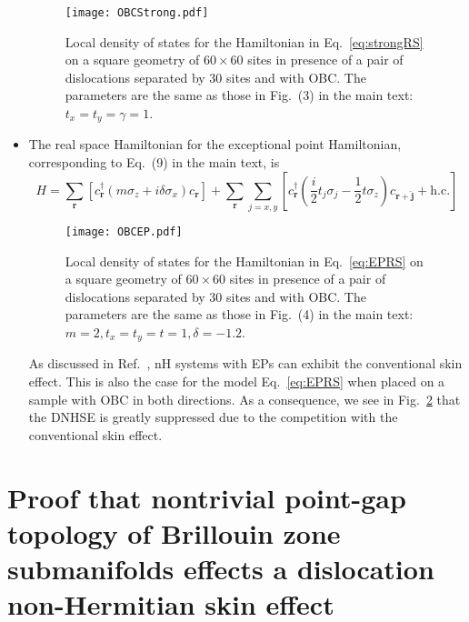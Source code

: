 \documentclass[prb,reprint,twocolumn,preprintnumbers,amsmath,amssymb,showpacs,nofootinbib,superscriptaddress]{revtex4-2}
\begin{document}
\begin{itemize}
\begin{figure}[t]
    \centering
    \texttt{[image: OBCStrong.pdf]}
    \caption{Local density of states for the Hamiltonian in Eq.~\eqref{eq:strongRS} on a square geometry of $60 \times 60$ sites in presence of a pair of dislocations separated by $30$ sites and with OBC. The parameters are the same as those in Fig.~(3) in the main text: $t_x = t_y = \gamma = 1$.}
    \label{fig:OBCStrong}
\end{figure}

\item The real space Hamiltonian for the exceptional point Hamiltonian, corresponding to Eq.~(9) in the main text, is
\begin{equation}
    \label{eq:EPRS}
    H = \sum_{\bm{r}} \left[ c_{\bm{r}}^\dagger \left(m \sigma_z + i \delta \sigma_x \right)c_{\bm{r}} \right] +  \sum_{\bm{r}} \sum_{j=x,y} \left[ c_{\bm{r}}^\dagger \left(\frac{i}{2}t_j \sigma_j -\frac{1}{2}t \sigma_z \right) c_{\bm{r}+ \bm{\hat{j}}}+ \text{h.c.} \right]
\end{equation}


\begin{figure}[t]
    \centering
    \texttt{[image: OBCEP.pdf]}
    \caption{Local density of states for the Hamiltonian in Eq.~\eqref{eq:EPRS} on a square geometry of $60 \times 60$ sites in presence of a pair of dislocations separated by $30$ sites and with OBC. The parameters are the same as those in Fig.~(4) in the main text: $m=2, t_x = t_y = t = 1, \delta=-1.2$.}
    \label{fig:OBCEP}
\end{figure}
As discussed in Ref.~\cite{zhang2021universal}, nH systems with EPs can exhibit the conventional skin effect. This is also the case for the model Eq.~\eqref{eq:EPRS} when placed on a sample with OBC in both directions. As a consequence, we see in Fig.~\ref{fig:OBCEP} that the DNHSE is greatly suppressed due to the competition with the conventional skin effect. 

\end{itemize}


\section{Proof that nontrivial point-gap topology of Brillouin zone submanifolds effects a dislocation non-Hermitian skin effect}
\label{sec:proof}
\end{document}
